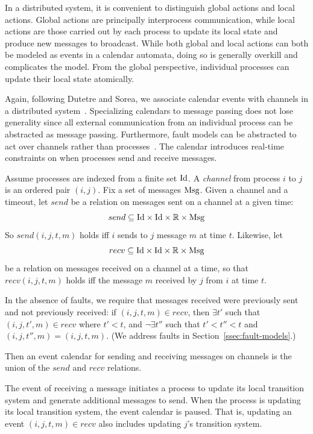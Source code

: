 In a distributed system, it is convenient to distinguish global actions
and local actions. Global actions are principally interprocess
communication, while local actions are those carried out by each process
to update its local state and produce new messages to broadcast. While
both global and local actions can both be modeled as events in a
calendar automata, doing so is generally overkill and complicates the
model. From the global perspective, individual processes can update
their local state atomically.

Again, following Dutetre and Sorea, we associate calendar events with
channels in a distributed system~\cite{Dutertre-Sorea-2004}. Specializing calendars to
message passing does not lose generality since all external
communication from an individual process can be abstracted as message
passing. Furthermore, fault models can be abstracted to act over
channels rather than processes~\cite{abstractions}. The calendar
introduces real-time constraints on when processes send and receive
messages.

Assume processes are indexed from a finite set $\mathrm{Id}$. A \emph{channel}
from process $i$ to $j$ is an ordered pair $(i,j)$. Fix a set of
messages $\mathrm{Msg}$. Given a channel and a timeout, let $send$ be a relation
on messages sent on a channel at a given time: $$send \subseteq \mathrm{Id}
\times \mathrm{Id} \times \mathbb{R} \times \mathrm{Msg}$$ So $send(i, j, t, m)$ holds
iff $i$ sends to $j$ message $m$ at time $t$. Likewise, let $$recv
\subseteq \mathrm{Id} \times \mathrm{Id} \times \mathbb{R} \times \mathrm{Msg}$$ be a relation
on messages received on a channel at a time, so that $recv(i, j, t, m)$
holds iff the message $m$ received by $j$ from $i$ at time $t$.

In the absence of faults, we require that messages received were
previously sent and not previously received: if $(i, j, t, m) \in recv$,
then $\exists t'$ such that $(i, j, t', m) \in recv$ where $t' < t$, and
$\neg\exists t''$ such that $t' < t'' < t$ and $(i, j, t'', m) = (i, j,
t, m)$. (We address faults in Section~\ref{ssec:fault-models}.)

Then an event calendar for sending and receiving messages on channels is
the union of the $send$ and $recv$ relations.

The event of receiving a message initiates a process to update its local
transition system and generate additional messages to send. When the
process is updating its local transition system, the event calendar is
paused. That is, updating an event $(i, j, t, m) \in recv$ also includes
updating $j$'s transition system.


